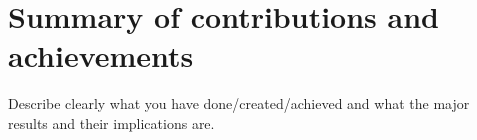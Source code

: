 \section{Summary of contributions and achievements} %
\label{sec:intro_sum_results} %
Describe clearly what you have done/created/achieved and what the major results and their implications are. 



